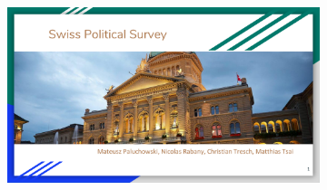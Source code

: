 \documentclass[aspectratio=169]{beamer}
\begin{document}
\begin{frame}
\begin{figure}
\begin{subfigure}[b]{0.47\linewidth}
		\end{subfigure}
		\hfill
		\begin{subfigure}[b]{0.47\linewidth}
			\includegraphics[width=\linewidth]{project2017_politics}
		\end{subfigure}
	\end{figure}
\end{frame}

\end{document}
